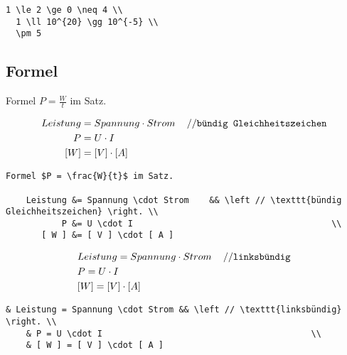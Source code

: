 \lstset{language=[LaTeX]TeX } %
\begin{lstlisting}[gobble=2, frame=none, numbers=none, backgroundcolor=\color{white},%
	caption={},label={code:}]
	1 \le 2 \ge 0 \neq 4 \\
  1 \ll 10^{20} \gg 10^{-5} \\
  \pm 5
\end{lstlisting}


\subsection{Formel}\label{formel }

Formel $P = \frac{W}{t}$ im Satz.

\begin{align}%
	Leistung &= Spannung \cdot Strom 	&& \left // \texttt{bündig Gleichheitszeichen} \right. \\
	       P &= U \cdot I 										\\
	   [ W ] &= [ V ] \cdot [ A ]
\end{align}

\lstset{language=[LaTeX]TeX } %
\begin{lstlisting}[gobble=2, frame=none, numbers=none, backgroundcolor=\color{white},%
	caption={},label={code:}]
	Formel $P = \frac{W}{t}$ im Satz.

	Leistung &= Spannung \cdot Strom 	&& \left // \texttt{bündig Gleichheitszeichen} \right. \\
	       P &= U \cdot I 										\\
	   [ W ] &= [ V ] \cdot [ A ]
\end{lstlisting}


\begin{align}%
& Leistung = Spannung \cdot Strom && \left // \texttt{linksbündig} \right. \\
& P = U \cdot I 										\\
& [ W ] = [ V ] \cdot [ A ]
\end{align}

\lstset{language=[LaTeX]TeX } %
\begin{lstlisting}[gobble=2, frame=none, numbers=none, backgroundcolor=\color{white},%
	caption={},label={code:}]
	& Leistung = Spannung \cdot Strom && \left // \texttt{linksbündig} \right. \\
	& P = U \cdot I 										\\
	& [ W ] = [ V ] \cdot [ A ]
\end{lstlisting}


